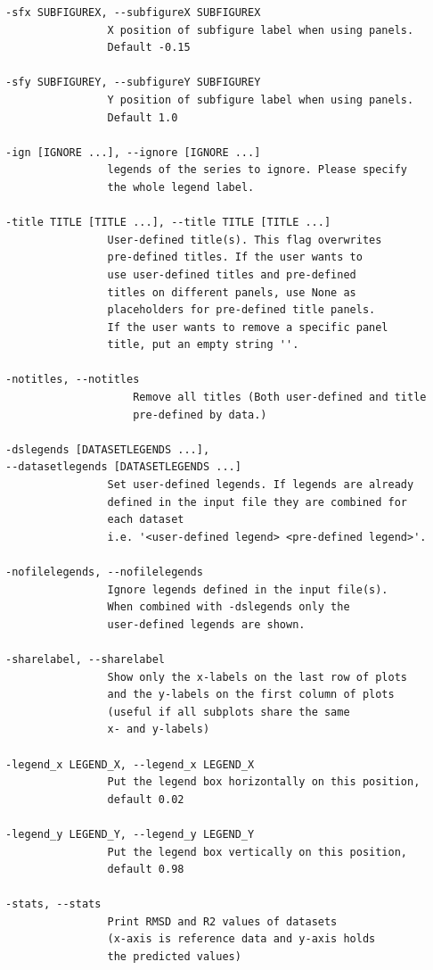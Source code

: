 \begin{verbatim}
-sfx SUBFIGUREX, --subfigureX SUBFIGUREX
                X position of subfigure label when using panels. 
                Default -0.15

-sfy SUBFIGUREY, --subfigureY SUBFIGUREY
                Y position of subfigure label when using panels. 
                Default 1.0

-ign [IGNORE ...], --ignore [IGNORE ...]
                legends of the series to ignore. Please specify 
                the whole legend label.

-title TITLE [TITLE ...], --title TITLE [TITLE ...]
                User-defined title(s). This flag overwrites 
                pre-defined titles. If the user wants to 
                use user-defined titles and pre-defined 
                titles on different panels, use None as 
                placeholders for pre-defined title panels. 
                If the user wants to remove a specific panel 
                title, put an empty string ''.

-notitles, --notitles
                    Remove all titles (Both user-defined and title 
                    pre-defined by data.)

-dslegends [DATASETLEGENDS ...], 
--datasetlegends [DATASETLEGENDS ...]
                Set user-defined legends. If legends are already 
                defined in the input file they are combined for 
                each dataset 
                i.e. '<user-defined legend> <pre-defined legend>'.

-nofilelegends, --nofilelegends
                Ignore legends defined in the input file(s). 
                When combined with -dslegends only the 
                user-defined legends are shown.

-sharelabel, --sharelabel
                Show only the x-labels on the last row of plots 
                and the y-labels on the first column of plots 
                (useful if all subplots share the same 
                x- and y-labels)

-legend_x LEGEND_X, --legend_x LEGEND_X
                Put the legend box horizontally on this position, 
                default 0.02
                
-legend_y LEGEND_Y, --legend_y LEGEND_Y
                Put the legend box vertically on this position, 
                default 0.98

-stats, --stats       
                Print RMSD and R2 values of datasets 
                (x-axis is reference data and y-axis holds 
                the predicted values)


\end{verbatim}
